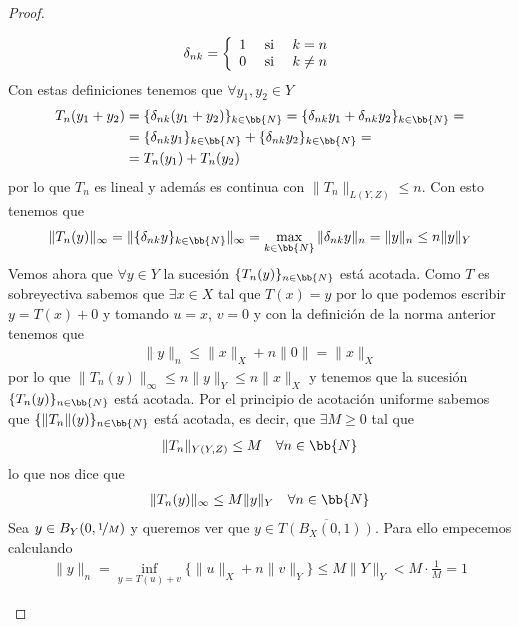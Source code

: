 \begin{teo}
\begin{proof}
\begin{itemize}
            \begin{gather*}
                \delta_{nk} = \left\{
                    \begin{array}{l c c}
                        1 & \text{ si } & k=n\\
                        0 & \text{ si } & k \neq n
                    \end{array}
                \right.
            \end{gather*}
            Con estas definiciones tenemos que $\forall y_1,y_2\in Y$
            \begin{align*}
                T_n(y_1+y_2) &= \{\delta_{nk}(y_1+y_2)\}_{k\in \bb{N}} = \{\delta_{nk}y_1 + \delta_{nk} y_2\}_{k\in \bb{N}} =\\
                &= \{\delta_{nk}y_1\}_{k\in \bb{N}} + \{\delta_{nk} y_2\}_{k\in \bb{N}} =\\
                &= T_n(y_1) + T_n(y_2)
            \end{align*}
            por lo que $T_n$ es lineal y además es continua con $\|T_n\|_{L(Y,Z)} \leq n$. Con esto tenemos que
            \begin{gather*}
                \|T_n(y)\|_\infty = \|\{\delta_{nk} y\}_{k\in \bb{N}}\|_{\infty} = \max_{k\in \bb{N}} \|\delta_{nk} y\|_n = \|y\|_n \leq n \|y\|_Y
            \end{gather*}
            Vemos ahora que $\forall y \in Y$ la sucesión $\{T_n(y)\}_{n\in \bb{N}}$ está acotada. Como $T$ es sobreyectiva sabemos que $\exists x\in X$ tal que $T(x) = y$ por lo que podemos escribir $y=T(x)+0$ y tomando $u=x$, $v=0$ y con la definición de la norma anterior tenemos que 
            \begin{gather*}
                \|y\|_n \leq \|x\|_X + n\|0\| = \|x\|_X
            \end{gather*}
            por lo que  $\|T_n(y)\|_\infty \leq n\|y\|_Y \leq n\|x\|_X$ y tenemos que la sucesión$\{T_n(y)\}_{n\in \bb{N}}$ está acotada. Por el principio de acotación uniforme sabemos que $\{\|T_n\|(y)\}_{n\in \bb{N}}$ está acotada, es decir, que $\exists M \geq 0$ tal que 
            \begin{gather*}
                \|T_n\|_{Y(Y,Z)} \leq M\ \ \ \forall n \in \bb{N}
            \end{gather*}
            lo que nos dice que
            \begin{gather*}
                \|T_n(y)\|_\infty \leq M \|y\|_Y\ \ \ \forall n \in \bb{N}
            \end{gather*}
            Sea $y\in B_Y(0,\nicefrac{1}{M})$ y queremos ver que $y\in \overline{T(B_X(0,1))}$. Para ello empecemos calculando
            \begin{gather*}
                \|y\|_n = \inf_{y=T(u)+v}\{\|u\|_X + n\|v\|_Y\} \leq M\|Y\|_Y < M \cdot \frac{1}{M} = 1
            \end{gather*}


\end{itemize}
\end{proof}
\end{teo}
